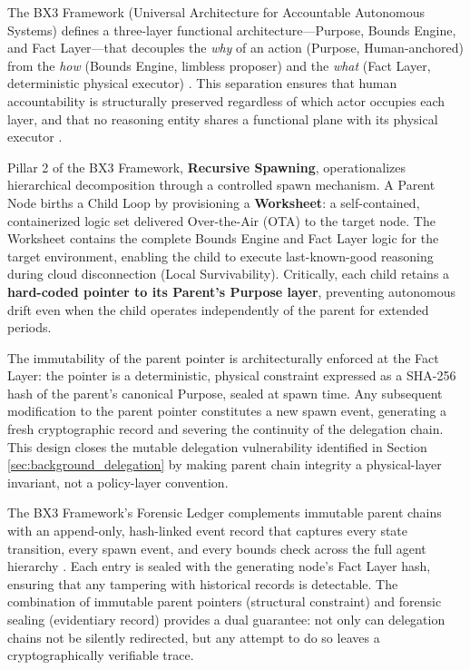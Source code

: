 The BX3 Framework (Universal Architecture for Accountable Autonomous Systems) defines a three-layer functional architecture---Purpose, Bounds Engine, and Fact Layer---that decouples the \emph{why} of an action (Purpose, Human-anchored) from the \emph{how} (Bounds Engine, limbless proposer) and the \emph{what} (Fact Layer, deterministic physical executor) \cite{beebe_2026_bx3_zenodo, beebe_2026_bx3_grant}. This separation ensures that human accountability is structurally preserved regardless of which actor occupies each layer, and that no reasoning entity shares a functional plane with its physical executor \cite{beebe_2026_bailout}.

Pillar 2 of the BX3 Framework, \textbf{Recursive Spawning}, operationalizes hierarchical decomposition through a controlled spawn mechanism. A Parent Node births a Child Loop by provisioning a \textbf{Worksheet}: a self-contained, containerized logic set delivered Over-the-Air (OTA) to the target node. The Worksheet contains the complete Bounds Engine and Fact Layer logic for the target environment, enabling the child to execute last-known-good reasoning during cloud disconnection (Local Survivability). Critically, each child retains a \textbf{hard-coded pointer to its Parent's Purpose layer}, preventing autonomous drift even when the child operates independently of the parent for extended periods.

The immutability of the parent pointer is architecturally enforced at the Fact Layer: the pointer is a deterministic, physical constraint expressed as a SHA-256 hash of the parent's canonical Purpose, sealed at spawn time. Any subsequent modification to the parent pointer constitutes a new spawn event, generating a fresh cryptographic record and severing the continuity of the delegation chain. This design closes the mutable delegation vulnerability identified in Section \ref{sec:background_delegation} by making parent chain integrity a physical-layer invariant, not a policy-layer convention.

The BX3 Framework's Forensic Ledger complements immutable parent chains with an append-only, hash-linked event record that captures every state transition, every spawn event, and every bounds check across the full agent hierarchy \cite{beebe_2026_bx3_zenodo}. Each entry is sealed with the generating node's Fact Layer hash, ensuring that any tampering with historical records is detectable. The combination of immutable parent pointers (structural constraint) and forensic sealing (evidentiary record) provides a dual guarantee: not only can delegation chains not be silently redirected, but any attempt to do so leaves a cryptographically verifiable trace.

